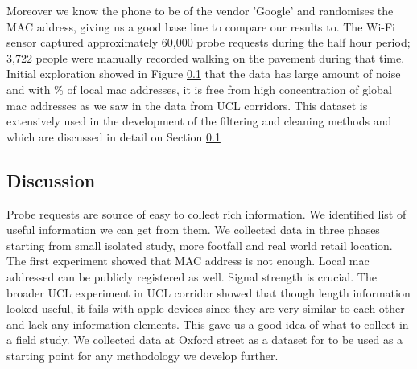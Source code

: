 Moreover we know the phone to be of the vendor 'Google' and randomises the MAC address, giving us a good base line to compare our results to.
The Wi-Fi sensor captured approximately 60,000 probe requests during the half hour period; 3,722 people were manually recorded walking on the pavement during that time.
Initial exploration showed in Figure \ref{} that the data has large amount of noise and with \% of local mac addresses, it is free from high concentration of global mac addresses as we saw in the data from UCL corridors.
This dataset is extensively used in the development of the filtering and cleaning methods and which are discussed in detail on Section \ref{}

\subsection{Discussion}
Probe requests are source of easy to collect rich information.
We identified list of useful information we can get from them.
We collected data in three phases starting from small isolated study, more footfall and real world retail location.
The first experiment showed that MAC address is not enough. Local mac addressed can be publicly registered as well.
Signal strength is crucial.
The broader UCL experiment in UCL corridor showed that though length information looked useful, it fails with apple devices since they are very similar to each other and lack any information elements. 
This gave us a good idea of what to collect in a field study. 
We collected data at Oxford street as a dataset for to be used as a starting point for any methodology we develop further.

